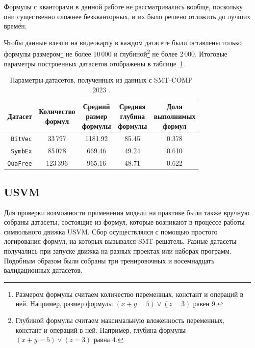 Формулы с кванторами в данной работе не рассматривались вообще, поскольку они существенно сложнее безкванторных, и их было решено отложить до лучших времён.

Чтобы данные влезли на видеокарту в каждом датасете были оставлены только формулы размером\footnote{Размером формулы считаем количество переменных, констант и операций в ней. Например, размер формулы $(x + y = 5) \vee (z = 3)$ равен 9.} не более 10\,000 и глубиной\footnote{Глубиной формулы считаем максимальную вложенность переменных, констант и операций в ней. Например, глубина формулы $(x + y = 5) \vee (z = 3)$ равна 4.} не более 2\,000. Итоговые параметры построенных датасетов отображены в таблице~\ref{smt-comp-datasets-table}.

\begin{table}[ht]
\begin{center}
\begin{tabular}{r|cccc}
    Датасет & \makecell{Количество \\ формул} & \makecell{Средний \\ размер \\ формулы} & \makecell{Средняя \\ глубина \\ формулы} & \makecell{Доля \\ выполнимых \\ формул} \\
    \hline \hline
    \rule{0pt}{2.5ex}
    \texttt{BitVec}  &  33\,797 & 1181.92 & 85.45 & 0.378 \\
    \texttt{SymbEx}  &  85\,078 &  669.46 & 49.24 & 0.610 \\
    \texttt{QuaFree} & 123\,396 &  965.16 & 48.71 & 0.622 \\
\end{tabular}
\caption{\label{smt-comp-datasets-table} Параметры датасетов, полученных из данных с SMT-COMP 2023 \cite{smt-comp-2023-benchmarks}.}
\end{center}
\end{table}

\subsection{USVM} \label{usvm-datasets-desc}


Для проверки возможности применения модели на практике были также вручную собраны датасеты, состоящие из формул, которые возникают в процессе работы символьного движка USVM. Сбор осуществлялся с помощью простого логирования формул, на которых вызывался SMT-решатель. Разные датасеты получались при запуске движка на разных проектах или наборах программ. Подобным образом были собраны три тренировочных и восемнадцать валидационных датасетов.


